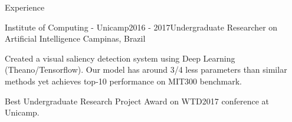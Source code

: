\documentclass[8pt]{resume}
\begin{document}
\begin{rSection}{Experience}
\begin{rSubsection}{Institute of Computing - Unicamp}{2016 - 2017}{Undergraduate Researcher on Artificial Intelligence}
    {Campinas, Brazil}
    \item Created a visual saliency detection system using Deep Learning (Theano/Tensorflow).
        Our model has around 3/4 less parameters than similar methods yet
        achieves top-10 performance on MIT300 benchmark.
    \item Best Undergraduate Research Project Award on WTD2017 conference at
        Unicamp.
\end{rSubsection}



\end{rSection}
\end{document}
